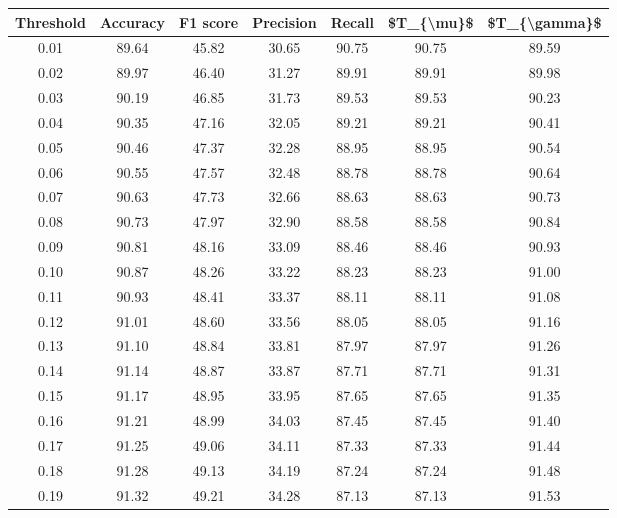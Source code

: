 \begin{tabular}{|c|c|c|c|c|c|c|}
\hline
 Threshold &  Accuracy &  F1 score &  Precision &  Recall &  \$T\_\{\textbackslash mu\}\$ &  \$T\_\{\textbackslash gamma\}\$ \\
\hline
      0.01 &     89.64 &     45.82 &      30.65 &   90.75 &      90.75 &         89.59 \\
      0.02 &     89.97 &     46.40 &      31.27 &   89.91 &      89.91 &         89.98 \\
      0.03 &     90.19 &     46.85 &      31.73 &   89.53 &      89.53 &         90.23 \\
      0.04 &     90.35 &     47.16 &      32.05 &   89.21 &      89.21 &         90.41 \\
      0.05 &     90.46 &     47.37 &      32.28 &   88.95 &      88.95 &         90.54 \\
      0.06 &     90.55 &     47.57 &      32.48 &   88.78 &      88.78 &         90.64 \\
      0.07 &     90.63 &     47.73 &      32.66 &   88.63 &      88.63 &         90.73 \\
      0.08 &     90.73 &     47.97 &      32.90 &   88.58 &      88.58 &         90.84 \\
      0.09 &     90.81 &     48.16 &      33.09 &   88.46 &      88.46 &         90.93 \\
      0.10 &     90.87 &     48.26 &      33.22 &   88.23 &      88.23 &         91.00 \\
      0.11 &     90.93 &     48.41 &      33.37 &   88.11 &      88.11 &         91.08 \\
      0.12 &     91.01 &     48.60 &      33.56 &   88.05 &      88.05 &         91.16 \\
      0.13 &     91.10 &     48.84 &      33.81 &   87.97 &      87.97 &         91.26 \\
      0.14 &     91.14 &     48.87 &      33.87 &   87.71 &      87.71 &         91.31 \\
      0.15 &     91.17 &     48.95 &      33.95 &   87.65 &      87.65 &         91.35 \\
      0.16 &     91.21 &     48.99 &      34.03 &   87.45 &      87.45 &         91.40 \\
      0.17 &     91.25 &     49.06 &      34.11 &   87.33 &      87.33 &         91.44 \\
      0.18 &     91.28 &     49.13 &      34.19 &   87.24 &      87.24 &         91.48 \\
      0.19 &     91.32 &     49.21 &      34.28 &   87.13 &      87.13 &         91.53 \\

\end{tabular}

